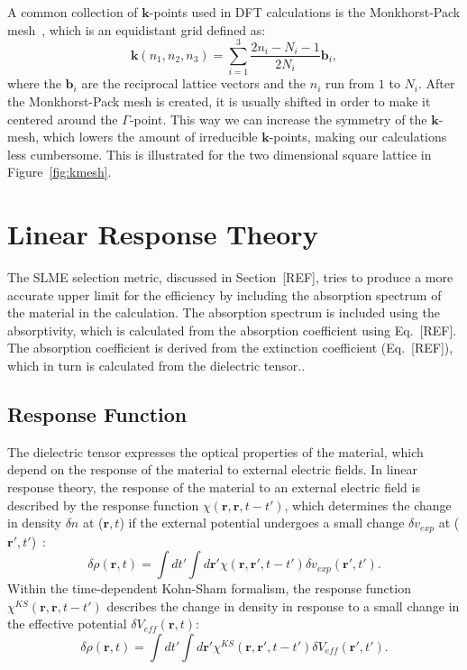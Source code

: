 \begin{refsection}
A common collection of $\mathbf{k}$-points used in DFT calculations is the Monkhorst-Pack mesh~\cite{Monkhorst1976}, which is an equidistant grid defined as:
\begin{equation}
\mathbf{k}(n_1,n_2,n_3) = \sum_{i=1}^{3} \frac{2n_i - N_i - 1}{2N_i} \mathbf{b}_i,
\end{equation}
where the $\mathbf{b}_i$ are the reciprocal lattice vectors and the $n_i$ run from $1$ to $N_i$. After the Monkhorst-Pack mesh is created, it is usually shifted in order to make it centered around the $\Gamma$-point. This way we can increase the symmetry of the $\mathbf{k}$-mesh, which lowers the amount of irreducible $\mathbf{k}$-points, making our calculations less cumbersome. This is illustrated for the two dimensional square lattice in Figure~\ref{fig:kmesh}.

\section{Linear Response Theory}\label{dft:sec-linear_response} 

The SLME selection metric, discussed in Section~[REF], tries to produce a more accurate upper limit for the efficiency by including the absorption spectrum of the material in the calculation. The absorption spectrum is included using the absorptivity, which is calculated from the absorption coefficient using Eq.~[REF]. The absorption coefficient is derived from the extinction coefficient (Eq.~[REF]), which in turn is calculated from the dielectric tensor..

\subsection{Response Function}

The dielectric tensor expresses the optical properties of the material, which depend on the response of the material to external electric fields. In linear response theory, the response of the material to an external electric field is described by the response function $\chi(\mathbf{r},\mathbf{r}, t - t')$, which determines the change in density $\delta n$ at ($\mathbf{r},t$) if the external potential undergoes a small change $\delta v_{exp}$ at ($\mathbf{r}',t'$)~\cite{Harl2008}:
\begin{equation}\label{eq:response}
\delta \rho (\mathbf{r},t) = \int dt' \int d\mathbf{r}' \chi(\mathbf{r},\mathbf{r}', t - t') \delta v_{exp} (\mathbf{r}',t').
\end{equation}
Within the time-dependent Kohn-Sham formalism, the response function $\chi^{KS}(\mathbf{r},\mathbf{r}, t - t')$ describes the change in density in response to a small change in the effective potential $\delta V_{eff}(\mathbf{r},t)$:
\begin{equation}\label{eq:KSresponse}
\delta \rho (\mathbf{r},t) = \int dt' \int d\mathbf{r}' \chi^{KS}(\mathbf{r},\mathbf{r}', t - t') \delta V_{eff} (\mathbf{r}',t').
\end{equation}


\end{refsection}

